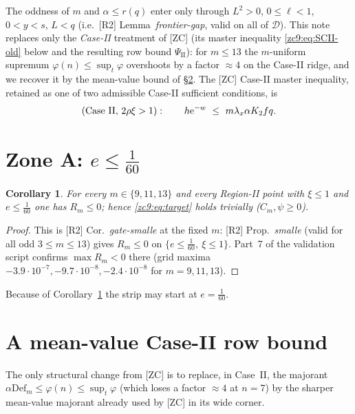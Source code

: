 \documentclass[11pt]{amsart}
\newtheorem{corollary}[theorem]{Corollary}
\newcommand{\eu}{\mathrm{e}}
\newcommand{\D}{\mathcal D}
\newcommand{\Def}{\mathrm{Def}}
\begin{document}
The oddness of $m$ and $\alpha\le r(q)$ enter only through $L^2>0$,
$0\le\ell<1$, $0<y<s$, $L<q$ (i.e.\ [R2] Lemma~\emph{frontier-gap}, valid on all
of $\D$).  This note replaces only the \emph{Case-II} treatment of [ZC] (its
master inequality \eqref{zc9:eq:SCII-old} below and the resulting row bound
$\Psi_{\mathrm{II}}$): for $m\le13$ the $m$-uniform supremum
$\varphi(n)\le\sup_t\varphi$ overshoots by a factor $\approx4$ on the Case-II
ridge, and we recover it by the mean-value bound of \S\ref{zc9:sec:mvt}.  The
[ZC] Case-II master inequality, retained as one of two admissible Case-II
sufficient conditions, is
\begin{equation}\label{zc9:eq:SCII-old}
 \textup{(Case II, }2\rho\xi>1):\qquad
 h\eu^{-w}\ \le\ m\lambda_x\alpha K_2 f q .
\end{equation}

\section{Zone A: $e\le\tfrac1{60}$}\label{zc9:sec:za}

\begin{corollary}\label{zc9:cor:za}
For every $m\in\{9,11,13\}$ and every Region-II point with $\xi\le1$ and
$e\le\tfrac1{60}$ one has $R_m\le0$; hence \eqref{zc9:eq:target} holds trivially
($C_m,\psi\ge0$).
\end{corollary}

\begin{proof}
This is [R2] Cor.~\emph{gate-smalle} at the fixed $m$: [R2]
Prop.~\emph{smalle} (valid for all odd $3\le m\le13$) gives $R_m\le0$ on
$\{e\le\tfrac1{60},\ \xi\le1\}$.  Part~7 of the validation script confirms
$\max R_m<0$ there (grid maxima $-3.9\cdot10^{-7},-9.7\cdot10^{-8},
-2.4\cdot10^{-8}$ for $m=9,11,13$).
\end{proof}

Because of Corollary~\ref{zc9:cor:za} the strip may start at $e=\tfrac1{60}$.

\section{A mean-value Case-II row bound}\label{zc9:sec:mvt}

The only structural change from [ZC] is to replace, in Case~II, the majorant
$\alpha\Def_m\le\varphi(n)\le\sup_t\varphi$ (which loses a factor
$\approx\!4$ at $n=7$) by the sharper mean-value majorant already used by [ZC]
in its wide corner.
\end{document}
